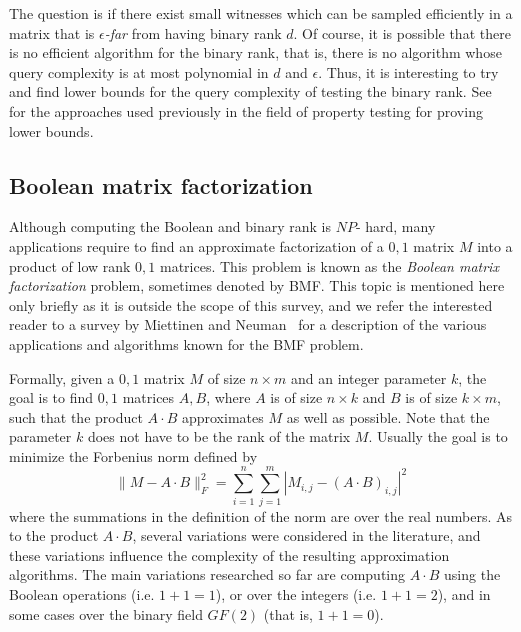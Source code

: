 \documentclass[11pt]{article}
\begin{document}
{{The question is if there exist small witnesses which can be sampled efficiently in a matrix that is {\em $\epsilon$-far} from having  binary rank $d$.
Of course, it is possible that there is no efficient algorithm for the binary rank, that is, there is no  algorithm whose query complexity is at most polynomial in $d$ and $\epsilon$.
Thus, it is interesting to try and find lower bounds for the query complexity of testing the binary rank.
See~\cite{goldreich2017introduction} for the approaches used previously in the field of property testing for proving lower bounds.



\subsection{Boolean matrix factorization}
\label{subsec-BMF}

Although computing the Boolean and binary rank is $NP$- hard,
many applications require to find an approximate factorization of a $0,1$ matrix $M$ into a product of low rank $0,1$ matrices.
This problem is known as the {\em Boolean matrix factorization} problem, sometimes denoted by BMF.
This topic is mentioned here only briefly as it is outside the scope of this survey, and we refer the interested reader to a survey by
Miettinen and Neuman~\cite{miettinen2021recent} for a description of the various applications and algorithms known for the BMF problem.

Formally, given a $0,1$ matrix $M$ of size $n \times m$ and an integer parameter $k$,
the goal is to find $0,1$ matrices $A,B$, where $A$ is of size $n \times k$ and $B$ is of size $k \times m$,
such that the product $A \cdot B$ approximates $M$ as well as possible. Note that the parameter $k$ does not have to be the rank of the matrix $M$.
Usually the goal is to minimize the Forbenius norm defined by
 $$
 \| M- A\cdot B\|_{F}^2 = \sum_{i=1}^n \sum_{j = 1}^m | M_{i,j} - (A\cdot B)_{i,j}|^2
 $$
where the summations in the definition of the norm are over the real numbers.
As to the product $A\cdot B$, several variations were considered in the literature, and these variations influence the complexity of the resulting approximation algorithms.
The main variations researched so far are computing $A\cdot B$ using the Boolean operations (i.e. $1+1 = 1$),
or over the integers (i.e. $1 + 1 = 2$), and in some cases over the binary field $GF(2)$ (that is, $1 + 1 = 0$).

}}
\end{document}
